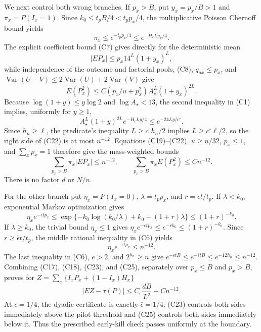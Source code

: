 We next control both wrong branches.  If \(p_x>B\), put \(y_x=p_x/B>1\) and \(\pi_x=P(I_x=1)\).  Since \(k_0\le t_pB/4<t_pp_x/4\), the multiplicative Poisson Chernoff bound yields
\[
 \pi_x\le e^{-t_pp_x/4}\le e^{-H_\epsilon Ly_x/4}.                 \tag{C19}
\]
The explicit coefficient bound (C7) gives directly for the deterministic mean
\[
 |EP_x|\le p_x14^L(1+y_x)^L,                                      \tag{C20}
\]
while independence of the outcome and factorial pools, (C8), \(q_{ax}\le p_x\), and \(\operatorname{Var}(U-V)\le2\operatorname{Var}(U)+2\operatorname{Var}(V)\) give
\[
 E(P_x^2)\le C(p_x/u+p_x^2)A_\star^L(1+y_x)^{2L}.                  \tag{C21}
\]
Because \(\log(1+y)\le y\log2\) and \(\log A_\star<13\), the second inequality in (C1) implies, uniformly for \(y\ge1\),
\[
 A_\star^L(1+y)^{2L}e^{-H_\epsilon Ly/4}
 \le e^{-24Ly/c^\circ}.                                           \tag{C22}
\]
Since \(h_n\ge\ell\), the predicate's inequality \(L\ge c^\circ h_n/2\) implies \(L\ge c^\circ\ell/2\), so the right side of (C22) is at most \(n^{-12}\).  Equations (C19)--(C22), \(u\ge n/32\), \(p_x\le1\), and \(\sum_xp_x=1\) therefore give the mass-weighted bounds
\[
 \sum_{p_x>B}\pi_x|EP_x|\le n^{-12},
 \qquad
 \sum_{p_x>B}\pi_xE(P_x^2)\le Cn^{-12}.                          \tag{C23}
\]
There is no factor \(d\) or \(N/n\).

For the other branch put \(\eta_x=P(I_x=0)\), \(\lambda=t_pp_x\), and \(r=\epsilon t/t_p\).  If \(\lambda<k_0\), exponential Markov optimization gives
\[
 \eta_xe^{-\epsilon tp_x}
 \le\exp\{-k_0\log(k_0/\lambda)+k_0-(1+r)\lambda\}
 \le(1+r)^{-k_0}.                                                    \tag{C24}
\]
If \(\lambda\ge k_0\), the trivial bound \(\eta_x\le1\) gives \(\eta_xe^{-\epsilon tp_x}\le e^{-rk_0}\le(1+r)^{-k_0}\).  Since \(r\ge\bar\epsilon t/t_p\), the middle rational inequality in (C6) yields
\[
 \eta_xe^{-\epsilon tp_x}\le n^{-12}.                             \tag{C25}
\]
The last inequality in (C6), \(e>2\), and \(2^{h_n}\ge n\) give \(e^{-\epsilon tB}\le e^{-\bar\epsilon tB}\le e^{-12h_n}\le n^{-12}\).  Combining (C17), (C18), (C23), and (C25), separately over \(p_x\le B\) and \(p_x>B\), proves for \(Z=\sum_x\{I_xP_x+(1-I_x)H_x\}\)
\[
 |EZ-\tau(P)|\le C_\epsilon\frac{dB}{L^2}+Cn^{-12}.                \tag{C26}
\]
At \(\epsilon=1/4\), the dyadic certificate is exactly \(\bar\epsilon=1/4\); (C23) controls both sides immediately above the pilot threshold and (C25) controls both sides immediately below it.  Thus the prescribed early-kill check passes uniformly at the boundary.

